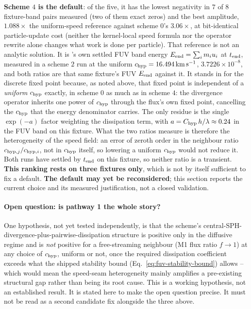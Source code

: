 \textbf{Scheme $4$ is the default}: of
the five, it has the lowest negativity in $7$ of $8$ fixture-band pairs
measured (two of them exact zeros) and the best amplitude,
$1.088\times$ the uniform-speed reference against scheme $0$'s
$3.06\times$, at bit-identical particle-update cost (neither the
kernel-local speed formula nor the operator rewrite alone changes what
work is done per particle). That reference is not an analytic solution.
It is 's own settled FUV band energy
$E_{\rm end} = \sum_i m_i u_i$ at $t_{\rm end}$, measured in a scheme
$2$ run at the uniform $c_{\rm hyp} = 16.494\,{\rm km\,s^{-1}}$,
$3.7226\times10^{-8}$, and both ratios are that same fixture's FUV
$E_{\rm end}$ against it. It stands in for the discrete fixed point
because, as noted above, that fixed point is independent of a
\emph{uniform} $c_{\rm hyp}$ exactly, in scheme $0$ as much as in scheme
$4$: the divergence operator inherits one power of $c_{\rm hyp}$ through
the flux's own fixed point, cancelling the $c_{\rm hyp}$ that the energy
denominator carries. The only residue is the single $\exp(-a)$ factor
weighting the dissipation term, with
$a = C_{\rm hyp}\,h/\lambda \approx 0.24$ in the FUV band on this
fixture. What the two ratios measure is therefore the heterogeneity of
the speed field: an error of zeroth order in the neighbour ratio
$c_{{\rm hyp},j}/c_{{\rm hyp},i}$, not in $c_{\rm hyp}$ itself, so
lowering a uniform $c_{\rm hyp}$ would not reduce it. Both runs have
settled by $t_{\rm end}$ on this fixture, so neither ratio is a
transient. \textbf{This ranking rests on
three fixtures only}, which is not by itself sufficient to fix a
default. \textbf{The default may yet be reconsidered}; this
section reports the current choice and its
measured justification, not a closed validation.

\paragraph{Open question: is pathway 1 the whole story?} One
hypothesis, not yet tested independently, is that the
scheme's central-SPH-divergence-plus-pairwise-dissipation structure is
positive only in the diffusive regime and is \emph{not} positive for a
free-streaming neighbour (M1 flux ratio $f\to1$) at any choice of
$c_{\rm hyp}$, uniform or not, once the required dissipation coefficient
exceeds what the shipped stability bound (Eq.~\ref{eq:fuv-stability-bound})
allows -- which would mean the speed-seam heterogeneity mainly amplifies
a pre-existing structural gap rather than being its root cause. This is
a working hypothesis, not an established result. It is stated here to make
the open question precise. It must not be read as
a second candidate fix alongside the three above.

